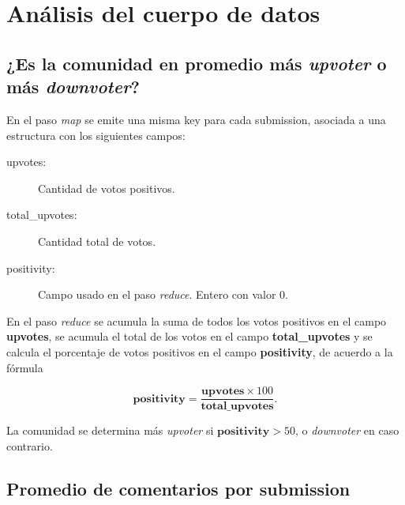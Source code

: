 \documentclass[a4paper,10pt,twoside]{article}
\newcommand{\map}{\emph{map}\xspace}
\newcommand{\reduce}{\emph{reduce}\xspace}
\begin{document}
\newpage




\tableofcontents

\newpage




\section{Análisis del cuerpo de datos}


\subsection{¿Es la comunidad en promedio más \emph{upvoter} o más \emph{downvoter}?}

En el paso \map se emite una misma key para cada submission, asociada a una estructura con los siguientes campos:

\begin{description}
	\item[upvotes:] Cantidad de votos positivos.
	\item[total\_upvotes:] Cantidad total de votos.
	\item[positivity:] Campo usado en el paso \reduce. Entero con valor 0.
\end{description}

En el paso \reduce se acumula la suma de todos los votos positivos en el campo \textbf{upvotes}, se acumula el total de los votos en el campo \textbf{total\_upvotes} y se calcula el porcentaje de votos positivos en el campo \textbf{positivity}, de acuerdo a la fórmula

$$\textbf{positivity} = \frac{\textbf{upvotes} \times 100}{\textbf{total\_upvotes}}.$$

La comunidad se determina más \emph{upvoter} si $\textbf{positivity} > 50$, o \emph{downvoter} en caso contrario.


\subsection{Promedio de comentarios por submission}
\end{document}
